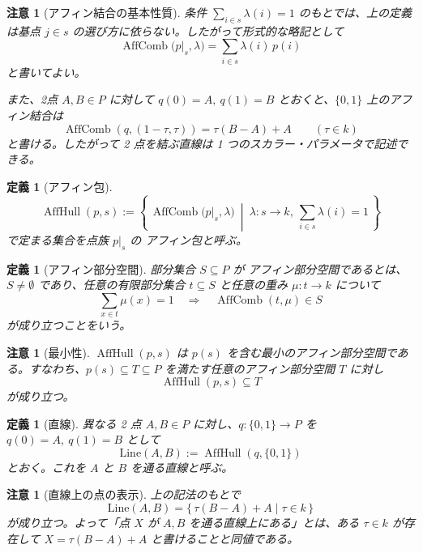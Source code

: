 \documentclass[a4paper,12pt]{bxjsbook}
\theoremstyle{theorem}
\newtheorem{definition}[theorem]{定義}
\newtheorem{remark}[theorem]{注意}
\DeclareMathOperator{\AffHull}{AffHull}
\DeclareMathOperator{\AffComb}{AffComb}
\begin{document}
    \begin{remark}[アフィン結合の基本性質]
        条件 $\sum_{i\in s}\lambda(i)=1$ のもとでは、上の定義は基点 $j\in s$ の選び方に依らない。したがって形式的な略記として
        \[
          \AffComb\bigl(p|_s,\lambda\bigr)=\sum_{i\in s}\lambda(i)\,p(i)
        \]
        と書いてよい。

        また、2点 $A,B\in P$ に対して $q(0)=A,\ q(1)=B$ とおくと、$\{0,1\}$ 上のアフィン結合は
        \[
          \AffComb(q,(1-\tau,\tau)) = \tau(B-A)+A
          \qquad (\tau\in k)
        \]
        と書ける。したがって 2 点を結ぶ直線は 1 つのスカラー・パラメータで記述できる。
    \end{remark}

    \begin{definition}[アフィン包]
        \[
          \AffHull(p,s)
          :=
          \left\{\,
            \AffComb\bigl(p|_s,\lambda\bigr)
            \ \middle|\
            \lambda:s\to k,\ \sum_{i\in s}\lambda(i)=1
          \,\right\}
        \]
        で定まる集合を点族 $p|_s$ の \emph{アフィン包}と呼ぶ。
    \end{definition}

    \begin{definition}[アフィン部分空間]
        部分集合 $S\subseteq P$ が \emph{アフィン部分空間}であるとは、$S\neq\emptyset$ であり、任意の有限部分集合 $t\subseteq S$ と任意の重み $\mu:t\to k$ について
        \[
          \sum_{x\in t}\mu(x)=1
          \quad\Longrightarrow\quad
          \AffComb(t,\mu)\in S
        \]
        が成り立つことをいう。
    \end{definition}

    \begin{remark}[最小性]
        $\AffHull(p,s)$ は $p(s)$ を含む最小のアフィン部分空間である。すなわち、$p(s)\subseteq T\subseteq P$ を満たす任意のアフィン部分空間 $T$ に対し
        \[
          \AffHull(p,s)\subseteq T
        \]
        が成り立つ。
    \end{remark}

    \begin{definition}[直線]
        異なる 2 点 $A,B\in P$ に対し、$q:\{0,1\}\to P$ を $q(0)=A,\ q(1)=B$ として
        \[
          \mathrm{Line}(A,B):=\AffHull(q,\{0,1\})
        \]
        とおく。これを $A$ と $B$ を通る\emph{直線}と呼ぶ。
    \end{definition}

    \begin{remark}[直線上の点の表示]
        上の記法のもとで
        \[
          \mathrm{Line}(A,B)=\{\,\tau(B-A)+A\mid \tau\in k\,\}
        \]
        が成り立つ。よって「点 $X$ が $A,B$ を通る直線上にある」とは、ある $\tau\in k$ が存在して $X=\tau(B-A)+A$ と書けることと同値である。
    \end{remark}
\end{document}
